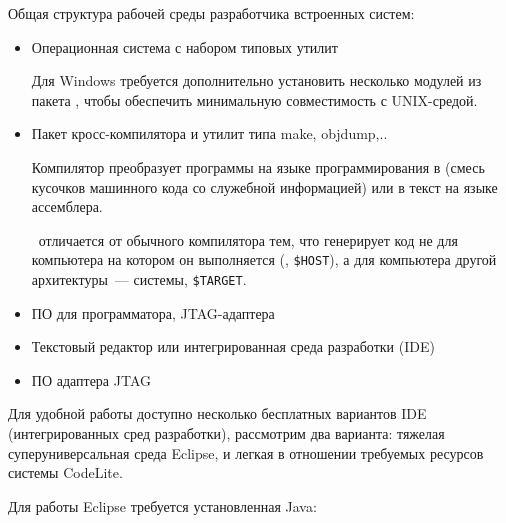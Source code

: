 



Общая структура рабочей среды разработчика встроенных систем:

\begin{itemize}
  \item Операционная система с набором типовых утилит
  
  Для Windows требуется дополнительно установить несколько модулей из пакета
  , чтобы обеспечить минимальную совместимость с UNIX-средой.
  
  \item Пакет кросс-компилятора и утилит типа make, objdump,..
  
  Компилятор преобразует программы на языке программирования в  (смесь кусочков машинного кода со служебной информацией) или в
  текст на языке ассемблера.
  
  \ отличается от обычного компилятора тем, что
  генерирует код не для компьютера на котором он выполняется
  (, \verb|$HOST|), а для компьютера другой
  архитектуры\ ---  системы, \verb|$TARGET|.
  
  \item ПО для программатора, JTAG-адаптера
  \item Текстовый редактор или интегрированная среда разработки (IDE)
  \item ПО адаптера JTAG
\end{itemize}


Для удобной работы доступно несколько бесплатных вариантов IDE (интегрированных сред разработки),
рассмотрим два варианта: тяжелая суперуниверсальная среда Eclipse, и легкая в отношении требуемых
ресурсов системы CodeLite.

\bigskip Для работы Eclipse требуется установленная Java:

\bigskip{}

